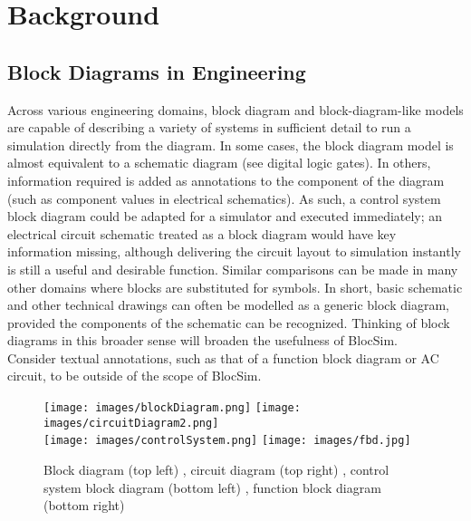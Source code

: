 \begin{comment}

\end{comment}


\chapter{Background}

\section{Block Diagrams in Engineering}


Across various engineering domains, block diagram and block-diagram-like models are capable of describing a variety of systems in sufficient detail to run a simulation directly from the diagram. In some cases, the block diagram model is almost equivalent to a schematic diagram (see digital logic gates). In others, information required is added as annotations to the component of the diagram (such as component values in electrical schematics). As such, a control system block diagram could be adapted for a simulator and executed immediately; an electrical circuit schematic treated as a block diagram would have key information missing, although delivering the circuit layout to simulation instantly is still a useful and desirable function. Similar comparisons can be made in many other domains where blocks are substituted for symbols. In short, basic schematic and other technical drawings can often be modelled as a generic block diagram, provided the components of the schematic can be recognized. Thinking of block diagrams in this broader sense will broaden the usefulness of BlocSim.
\\


Consider textual annotations, such as that of a function block diagram or AC circuit, to be outside of the scope of BlocSim.

\begin{figure}[ht!]
\texttt{[image: images/blockDiagram.png]}
\hspace{0.5 cm}
\texttt{[image: images/circuitDiagram2.png]} \\
\texttt{[image: images/controlSystem.png]} 
\hspace{0.5 cm}
\texttt{[image: images/fbd.jpg]} 
\centering
\caption{Block diagram (top left) \cite{wiringDiagrams}, circuit diagram (top right) \cite{engineeronadisk}, control system block diagram (bottom left) \cite{engineeronadisk}, function block diagram (bottom right) \cite{wikicommonsFbd}}
\label{im:blockExample}
\end{figure}

